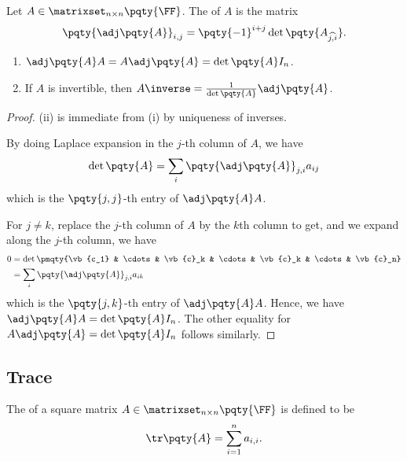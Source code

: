 \begin{definition}
    Let \(A \in \matrixset_{n \times n} \pqty{\FF}\). The  of \(A\) is the matrix
    \[
        \pqty{\adj\pqty{A}}_{i, j} = \pqty{-1}^{i + j} \det\pqty{A_{\widehat{j, i}}}.
    \]
\end{definition}

\begin{theorem}
    \label{thm:cramer}%
    \begin{enumerate}[label=(\roman*)]
        \item \(\adj\pqty{A} A = A \adj\pqty{A} = \det\pqty{A} I_n\).
        \item If \(A\) is invertible, then \(A\inverse = \frac{1}{\det\pqty{A}} \adj\pqty{A}\).
    \end{enumerate}
\end{theorem}

\begin{proof}
    (ii) is immediate from (i) by uniqueness of inverses.

    By doing Laplace expansion in the \(j\)-th column of \(A\), we have
    \[
        \det\pqty{A} = \sum_{i} \pqty{\adj\pqty{A}}_{j, i} a_{ij}
    \]
    which is the \(\pqty{j, j}\)-th entry of \(\adj\pqty{A} A\). 

    For \(j \neq k\), replace the \(j\)-th column of \(A\) by the \(k\)th column to get, and we expand along the \(j\)-th column, we have
    \begin{align*}
        0 &= \det \pmqty{\vb{c_1} & \cdots  & \vb{c}_k & \cdots & \vb{c}_k & \cdots & \vb{c}_n} \\
        &= \sum_{i} \pqty{\adj\pqty{A}}_{j, i} a_{ik}
    \end{align*}
    which is the \(\pqty{j, k}\)-th entry of \(\adj\pqty{A} A\). Hence, we have \(\adj\pqty{A} A = \det\pqty{A} I_n\). The other equality for \(A \adj\pqty{A} = \det\pqty{A} I_n\) follows similarly.
\end{proof}

\subsection{Trace}

\begin{definition}[Trace]
    The  of a square matrix \(A \in \matrixset_{n \times n} \pqty{\FF}\) is defined to be
    \[
        \tr\pqty{A} = \sum_{i = 1}^{n} a_{i, i}.
    \]
\end{definition}

